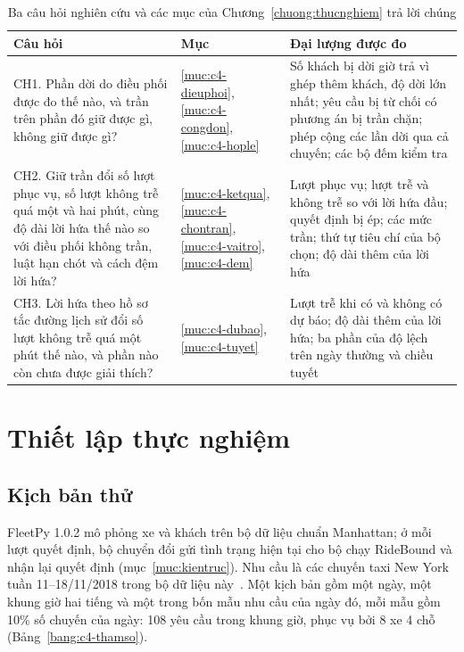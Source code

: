 \begin{table}[htbp]
\centering
\caption[Câu hỏi nghiên cứu và các mục trả lời]{Ba câu hỏi nghiên cứu và các mục của Chương~\ref{chuong:thucnghiem} trả lời chúng}
\label{bang:c4-lotrinh}
\small
\begin{tabular}{@{}p{6.3cm}p{2.4cm}p{6.3cm}@{}}
\toprule
\textbf{Câu hỏi} & \textbf{Mục} & \textbf{Đại lượng được đo}\\
\midrule
CH1. Phần dời do điều phối được đo thế nào, và trần trên phần đó giữ được gì, không giữ được gì?
& \ref{muc:c4-dieuphoi}, \ref{muc:c4-congdon}, \ref{muc:c4-hople}
& Số khách bị dời giờ trả vì ghép thêm khách, độ dời lớn nhất; yêu cầu bị từ chối có phương án bị trần chặn;
phép cộng các lần dời qua cả chuyến; các bộ đếm kiểm tra\\
CH2. Giữ trần đổi số lượt phục vụ, số lượt không trễ quá một và hai phút, cùng độ dài lời hứa thế nào so
với điều phối không trần, luật hạn chót và cách đệm lời hứa?
& \ref{muc:c4-ketqua}, \ref{muc:c4-chontran}, \ref{muc:c4-vaitro}, \ref{muc:c4-dem}
& Lượt phục vụ; lượt trễ và không trễ so với lời hứa đầu; quyết định bị ép; các mức trần; thứ tự tiêu chí
của bộ chọn; độ dài thêm của lời hứa\\
CH3. Lời hứa theo hồ sơ tắc đường lịch sử đổi số lượt không trễ quá một phút thế nào, và phần nào còn
chưa được giải thích?
& \ref{muc:c4-dubao}, \ref{muc:c4-tuyet}
& Lượt trễ khi có và không có dự báo; độ dài thêm của lời hứa; ba phần của độ lệch trên ngày thường và chiều
tuyết\\
\bottomrule
\end{tabular}
\end{table}

\section{Thiết lập thực nghiệm}
\label{muc:c4-thietlap}

\subsection{Kịch bản thử}
\label{muc:c4-kichban}

FleetPy 1.0.2 mô phỏng xe và khách trên bộ dữ liệu chuẩn Manhattan; ở mỗi lượt quyết định, bộ chuyển đổi gửi tình
trạng hiện tại cho bộ chạy RideBound và nhận lại quyết định (mục~\ref{muc:kientruc}). Nhu cầu là các chuyến taxi New
York tuần 11--18/11/2018 trong bộ dữ liệu này~\cite{engelhardt2026}. Một kịch bản gồm một ngày, một khung giờ hai
tiếng và một trong bốn mẫu nhu cầu của ngày đó, mỗi mẫu gồm 10\% số chuyến của ngày: 108 yêu cầu trong khung giờ, phục
vụ bởi 8 xe 4 chỗ (Bảng~\ref{bang:c4-thamso}).

